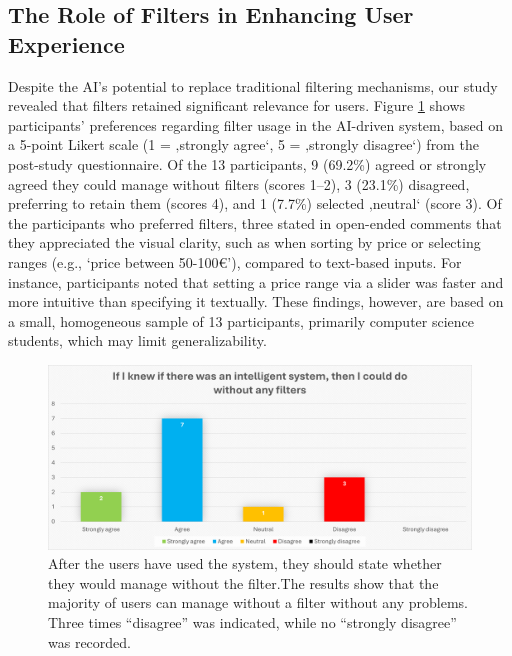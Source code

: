 \documentclass[../../submission.tex]{subfiles}
\begin{document}
 \subsection{The Role of Filters in Enhancing User Experience}
 Despite the AI’s potential to replace traditional filtering mechanisms, our study 
 revealed that filters retained significant relevance for users. 
 Figure \ref{fig:without_filter} shows participants’ preferences regarding filter usage in the AI-driven 
 system, based on a 5-point Likert scale (1 = ‚strongly agree‘, 5 = ‚strongly disagree‘) 
 from the post-study questionnaire. Of the 13 participants, 9 (69.2\%) agreed or 
 strongly agreed they could manage without filters (scores 1–2), 3 (23.1\%) 
 disagreed, preferring to retain them (scores 4), and 1 (7.7\%) selected ‚neutral‘ 
 (score 3).
 Of the participants who preferred filters, three stated in open-ended comments 
 that they appreciated the visual clarity, such as when sorting by price or selecting 
 ranges (e.g., ‘price between 50-100€’), compared to text-based inputs. 
 For instance, participants noted that setting a price range via a slider was 
 faster and more intuitive than specifying it textually.
 These findings, however, are based on a small, homogeneous sample of 13 participants, 
primarily computer science students, which may limit generalizability.



 \begin{figure}[h]
    \includegraphics[width=\textwidth]{images/without_filter}
    \caption{After the users have used the system, they should state whether they would manage without the filter.The results show that the majority of users can manage without a filter without any problems. Three times “disagree” was indicated, while no “strongly disagree” was recorded.}
    \Description{}
    \label{fig:without_filter}
 \end{figure}
\end{document}
